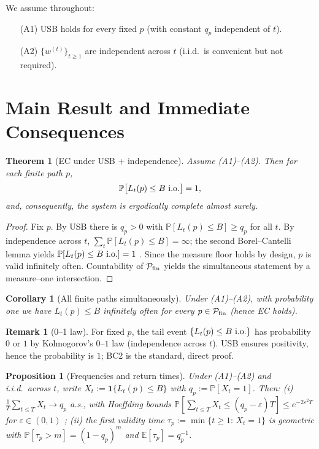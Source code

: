 \documentclass[11pt]{article}
\theoremstyle{plain}
\newtheorem{theorem}{Theorem}
\newtheorem{proposition}{Proposition}
\newtheorem{corollary}{Corollary}
\theoremstyle{definition}
\newtheorem{remark}{Remark}
\newcommand{\Prb}{\mathbb{P}}
\newcommand{\E}{\mathbb{E}}
\newcommand{\io}{\text{\rm i.o.}}
\begin{document}
We assume throughout:
\begin{itemize}[leftmargin=1.5em]
\item[(A1)] USB holds for every fixed $p$ (with constant $q_p$ independent of $t$).
\item[(A2)] $\{w^{(t)}\}_{t\ge 1}$ are independent across $t$ (i.i.d.\ is convenient but not required).
\end{itemize}

\section{Main Result and Immediate Consequences}
\begin{theorem}[EC under USB + independence]\label{thm:EC}
Assume \textup{(A1)}–\textup{(A2)}. Then for each finite path $p$,
\[
\Prb\big[L_t(p)\le B~\io\big]=1,
\]
and, consequently, the system is ergodically complete almost surely.
\end{theorem}

\begin{proof}
Fix $p$. By USB there is $q_p>0$ with $\Prb[L_t(p)\le B]\ge q_p$ for all $t$. By independence across $t$, $\sum_t \Prb[L_t(p)\le B]=\infty$; the second Borel–Cantelli lemma yields $\Prb[L_t(p)\le B~\io]=1$ \cite[§2.3]{Billingsley,Durrett}. Since the measure floor holds by design, $p$ is valid infinitely often. Countability of $\mathcal{P}_{\rm fin}$ yields the simultaneous statement by a measure–one intersection.
\end{proof}

\begin{corollary}[All finite paths simultaneously]\label{cor:allpaths}
Under \textup{(A1)}–\textup{(A2)}, with probability one we have $L_t(p)\le B$ infinitely often for \emph{every} $p\in\mathcal{P}_{\rm fin}$ (hence EC holds).
\end{corollary}

\begin{remark}[0–1 law]
For fixed $p$, the tail event $\{L_t(p)\le B~\io\}$ has probability $0$ or $1$ by Kolmogorov’s $0$–$1$ law (independence across $t$). USB ensures positivity, hence the probability is $1$; BC2 is the standard, direct proof.
\end{remark}

\begin{proposition}[Frequencies and return times]\label{prop:freq}
Under \textup{(A1)}–\textup{(A2)} and i.i.d.\ across $t$, write $X_t:=\mathbf{1}\{L_t(p)\le B\}$ with $q_p:=\Prb[X_t=1]$.
Then: (i) $\tfrac1T\sum_{t\le T} X_t \to q_p$ a.s., with Hoeffding bounds
\(\Prb[\sum_{t\le T}X_t \le (q_p-\varepsilon)T] \le e^{-2\varepsilon^2 T}\) for $\varepsilon\in(0,1)$ \cite{Hoeffding};
(ii) the first validity time $\tau_p:=\min\{t\ge 1:\, X_t=1\}$ is geometric with
\(\Prb[\tau_p>m]=(1-q_p)^m\) and \(\E[\tau_p]=q_p^{-1}\).
\end{proposition}
\end{document}
